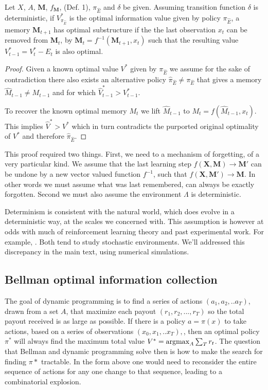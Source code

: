 \begin{theorem} \label{theorem:opt_sub} 
    Let $X$, $A$, $\mathbf{M}$, $f_{\mathbf{M}}$, (Def. 1), $\pi_{\hat E}$ and $\delta$ be given. Assuming transition function $\delta$ is deterministic, if $V^*_{\pi_{\hat E}}$ is the optimal information value given by policy $\pi_{\hat E}$, a memory $\mathbf{M}_{t+1}$ has optimal substructure if the the last observation $x_t$ can be removed from $\mathbf{M}_t$, by $\mathbf{M}_{t} = f^{-1}(\mathbf{M}_{t+1}, x_t)$ such that the resulting value $V^*_{t-1} = V^*_{t} - E_{t}$ is also optimal. 
\end{theorem}
\begin{proof}
	Given a known optimal value $V^*$ given by $\pi_{\hat E}$ we assume for the sake of contradiction there also exists an alternative policy $\hat \pi_{\hat E} \neq \pi_{\hat E}$ that gives a memory $\hat M_{t-1} \neq M_{t-1}$ and for which $\hat V^*_{t-1} > V^*_{t-1}$. 
	
	To recover the known optimal memory $M_t$ we lift $\hat M_{t-1}$ to $M_t = f(\hat M_{t-1}, x_t)$. This implies $\hat V^* > V^*$ which in turn contradicts the purported original optimality of $V^*$ and therefore $\hat \pi_{\hat E}$.
\end{proof}

This proof required two things. First, we need to a mechanism of forgetting, of a very particular kind. We assume that the last learning step $f(\mathbf{X}, \mathbf{M}) \rightarrow \mathbf{M}'$ can be undone by a new vector valued function $f^{-1}$, such that $f(\mathbf{X}, \mathbf{M'}) \rightarrow \mathbf{M}$. In other words we must assume what was last remembered, can always be exactly forgotten. Second we must also assume the environment $\Lambda$ is deterministic. 

Determinism is consistent with the natural world, which does evolve in a deterministic way, at the scales we concerned with. This assumption is however at odds with much of reinforcement learning theory \citep{Sutton2018} and past experimental work. For example, \citep{Gershman2018}. Both tend to study stochastic environments. We'll addressed this discrepancy in the main text, using numerical simulations.


\subsection*{Bellman optimal information collection}
The goal of dynamic programming is to find a series of actions $(a_1, a_2, ..a_T)$, drawn from a set $A$, that maximize each payout $(r_1, r_2, ..., r_{T})$ so the total payout received is as large as possible. If there is a policy $a = \pi(x)$ to take actions, based on a series of observations $(x_0, x_1, ..x_{T}),$, then an optimal policy $\pi^*$ will always find the maximum total value $V^* = \operatorname*{argmax}_{A} \sum_T r_t $. The question that Bellman and dynamic programming solve then is how to make the search for finding $\pi*$ tractable. In the form above one would need to reconsider the entire sequence of actions for any one change to that sequence, leading to a combinatorial explosion. 
	
